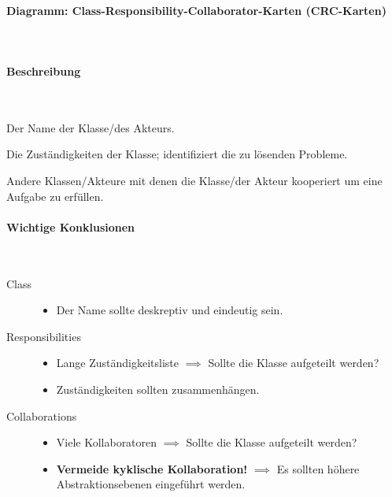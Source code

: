 \documentclass[ngerman]{tuda_summary}
\begin{document}
\paragraph{Diagramm: Class-Responsibility-Collaborator-Karten (CRC-Karten)}\mbox{}\\
\label{diagram:crc}

\paragraph{Beschreibung}\mbox{}\\
\begin{description}[leftmargin = 3cm]
    \item[Class] Der Name der Klasse/des Akteurs.
    \item[Responsibilities] Die Zuständigkeiten der Klasse; identifiziert die zu lösenden Probleme.
    \item[Collaborations] Andere Klassen/Akteure mit denen die Klasse/der Akteur kooperiert um eine Aufgabe zu erfüllen.
\end{description}


\paragraph{Wichtige Konklusionen}\mbox{}\\
\begin{description}
    \item[Class]
          \begin{itemize}
              \item Der Name sollte deskreptiv und eindeutig sein.
          \end{itemize}
    \item[Responsibilities]
          \begin{itemize}
              \item Lange Zuständigkeitsliste  $ \implies $ Sollte die Klasse aufgeteilt werden?
              \item Zuständigkeiten sollten zusammenhängen.
          \end{itemize}
    \item[Collaborations]
          \begin{itemize}
              \item Viele Kollaboratoren $ \implies $ Sollte die Klasse aufgeteilt werden?
              \item \textbf{Vermeide kyklische Kollaboration!} $ \implies $ Es sollten höhere Abstraktionsebenen eingeführt werden.
          \end{itemize}
\end{description}
\end{document}

